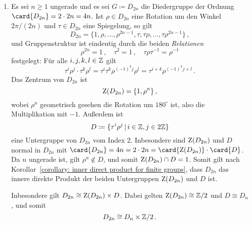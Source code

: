 \begin{example}
\begin{enumerate}
    \item
      Es sei $n \geq 1$ ungerade und es sei $G \coloneqq D_{2n}$ die Diedergruppe der Ordnung $\card{D_{2n}} = 2 \cdot 2n = 4n$.
      Ist $\rho \in D_{2n}$ eine Rotation um den Winkel $2\pi/(2n)$ und $\tau \in D_{2n}$ eine Spiegelung, so gilt
      \[
          D_{2n}
        = \{ 1, \rho, \dotsc, \rho^{2n-1}, \tau, \tau \rho, \dotsc, \tau \rho^{2n-1} \} \,,
      \]
      und Gruppenstruktur ist eindeutig durch die beiden \emph{Relationen}
      \[
              \rho^{2n} = 1 \,,
        \quad \tau^2    = 1 \,,
        \quad \tau \rho \tau^{-1} = \rho^{-1}
      \]
      festgelegt:
      Für alle $i, j, k, l \in \mathbb{Z}$ gilt
      \[
          \tau^i \rho^j \cdot \tau^k \rho^l
        = \tau^i  \tau^k \rho^{(-1)^k j} \rho^l
        = \tau^{i+k} \rho^{(-1)^k j + l} \,.
      \]
      Das Zentrum von $D_{2n}$ ist
      \[
          \operatorname{Z}(D_{2n})
        = \{1, \rho^n\} \,,
      \]
      wobei $\rho^n$ geometrisch gesehen die Rotation um $180^\circ$ ist, also die Multiplikation mit $-1$.
      Außerdem ist
      \[
                  D
        \coloneqq \{
                    \tau^i \rho^j
                  \suchthat
                    i \in \Integer,
                    j \in 2\Integer
                  \}
      \]
      eine Untergruppe von $D_{2n}$ vom Index $2$.
      Inbesondere sind $\operatorname{Z}(D_{2n})$ und $D$ normal in $D_{2n}$ mit $\card{D_{2n}} = 4n = 2 \cdot 2n = \card{\groupcenter{D_{2n}}} \cdot \card{D}$.
      Da $n$ ungerade ist, gilt $\rho^n \notin D$, und somit $\operatorname{Z}(D_{2n}) \cap D = 1$.
      Somit gilt nach Korollar~\ref{corollary: inner direct product for finite groups}, dass $D_{2n}$ das innere direkte Produkt der beiden Untergruppen $\operatorname{Z}(D_{2n})$ und $D$ ist.
      
      Inbesondere gilt $D_{2n} \cong \operatorname{Z}(D_{2n}) \times D$.
      Dabei gelten $\operatorname{Z}(D_{2n}) \cong \mathbb{Z}/2$ und $D \cong D_n$, und somit
      \[
        D_{2n} \cong D_n \times \mathbb{Z}/2 \,.
      \]
  \end{enumerate}
\end{example}


